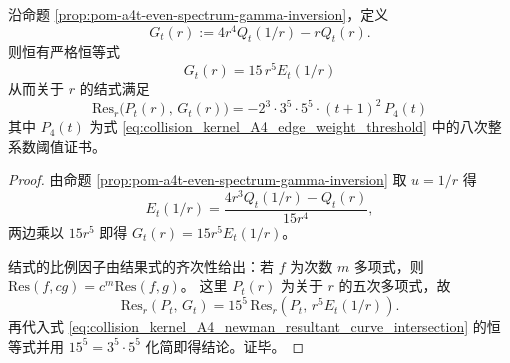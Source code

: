 

\begin{proposition}\label{prop:pom-a4t-newman-short-elimination}
沿命题 \ref{prop:pom-a4t-even-spectrum-gamma-inversion}，定义
\[
G_t(r):=4r^4Q_t(1/r)-rQ_t(r).
\]
则恒有严格恒等式
\[
\boxed{\;G_t(r)=15\,r^5E_t(1/r)\;}
\]
从而关于 \(r\) 的结式满足
\[
\boxed{\;
\mathrm{Res}_r\!\bigl(P_t(r),\,G_t(r)\bigr)
=-2^3\cdot 3^5\cdot 5^5\cdot (t+1)^2\,P_4(t)\;}
\]
其中 \(P_4(t)\) 为式 \eqref{eq:collision_kernel_A4_edge_weight_threshold} 中的八次整系数阈值证书。
\end{proposition}
\begin{proof}
由命题 \ref{prop:pom-a4t-even-spectrum-gamma-inversion} 取 \(u=1/r\) 得
\[
E_t(1/r)=\frac{4r^3Q_t(1/r)-Q_t(r)}{15r^4},
\]
两边乘以 \(15r^5\) 即得 \(G_t(r)=15r^5E_t(1/r)\)。
\par
结式的比例因子由结果式的齐次性给出：若 \(f\) 为次数 \(m\) 多项式，则 \(\mathrm{Res}(f,cg)=c^{m}\mathrm{Res}(f,g)\)。
这里 \(P_t(r)\) 为关于 \(r\) 的五次多项式，故
\[
\mathrm{Res}_r(P_t,\,G_t)=15^5\,\mathrm{Res}_r(P_t,\,r^5E_t(1/r)).
\]
再代入式 \eqref{eq:collision_kernel_A4_newman_resultant_curve_intersection} 的恒等式并用 \(15^5=3^5\cdot 5^5\) 化简即得结论。证毕。
\end{proof}

